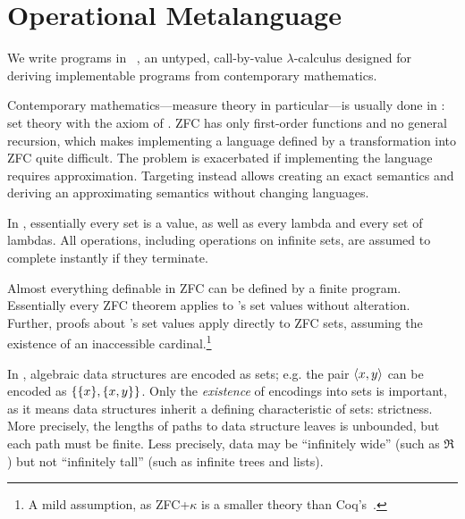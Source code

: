 \documentclass{llncs}
\begin{document}
\section{Operational Metalanguage}

We write programs in \lzfclang~\cite{cit:toronto-2012flops-lzfc}, an untyped, call-by-value $\lambda$-calculus designed for deriving implementable programs from contemporary mathematics.

Contemporary mathematics---measure theory in particular---is usually done in :  set theory with the axiom of .
ZFC has only first-order functions and no general recursion, which makes implementing a language defined by a transformation into ZFC quite difficult.
The problem is exacerbated if implementing the language requires approximation.
Targeting \lzfclang instead allows creating an exact semantics and deriving an approximating semantics without changing languages.

In \lzfclang, essentially every set is a value, as well as every lambda and every set of lambdas.
All operations, including operations on infinite sets, are assumed to complete instantly if they terminate.

Almost everything definable in ZFC can be defined by a finite \lzfclang program.
Essentially every ZFC theorem applies to \lzfclang's set values without alteration.
Further, proofs about \lzfclang's set values apply directly to ZFC sets, assuming the existence of an inaccessible cardinal.\footnote{A mild assumption, as ZFC+$\kappa$ is a smaller theory than Coq's~\cite{cit:barras-2010-sets-coq}.}

In \lzfclang, algebraic data structures are encoded as sets; e.g. the pair $\langle{x,y}\rangle$ can be encoded as $\{{\{{x}\},\{{x,y}\}}\}$.
Only the \emph{existence} of encodings into sets is important, as it means data structures inherit a defining characteristic of sets: strictness.
More precisely, the lengths of paths to data structure leaves is unbounded, but each path must be finite.
Less precisely, data may be ``infinitely wide'' (such as $\Re$) but not ``infinitely tall'' (such as infinite trees and lists).

\end{document}

